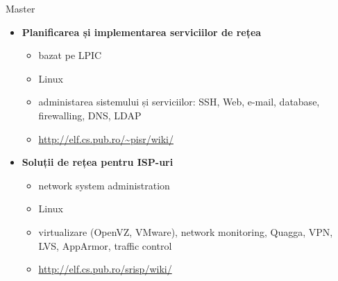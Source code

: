 \documentclass{beamer}
\begin{document}

\begin{frame}{Master}
	\begin{itemize}
		\item \textbf{Planificarea și implementarea serviciilor de rețea}
			\begin{itemize}
				\item bazat pe LPIC
				\item Linux
				\item administarea sistemului și serviciilor: SSH, Web,
				e-mail, database, firewalling, DNS, LDAP
				\item \url{http://elf.cs.pub.ro/~pisr/wiki/}
			\end{itemize}
		\item \textbf{Soluții de rețea pentru ISP-uri}
			\begin{itemize}
				\item network system administration
				\item Linux
				\item virtualizare (OpenVZ, VMware), network monitoring,
				Quagga, VPN, LVS, AppArmor, traffic control
				\item \url{http://elf.cs.pub.ro/srisp/wiki/}
			\end{itemize}
	\end{itemize}
\end{frame}
\end{document}
